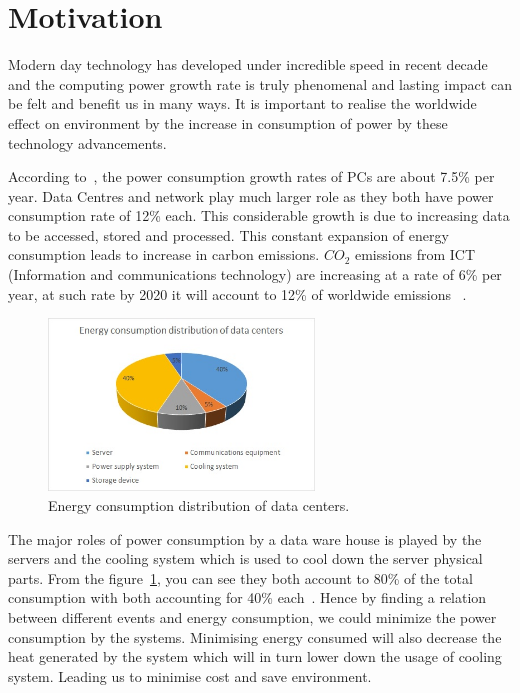 \section{Motivation}
Modern day technology has developed under incredible speed in recent decade and the computing power growth rate is truly phenomenal and lasting impact can be felt and benefit us in many ways. It is important to realise the worldwide effect on environment by the increase in consumption of power by these technology advancements.

According to~\cite{pickavet2008worldwide}, the power consumption growth rates of PCs are about 7.5\% per year. Data Centres and network play much larger role as they both have power consumption rate of 12\% each. This considerable growth is due to increasing data to be accessed, stored and processed. This constant expansion of energy consumption leads to increase in carbon emissions. \(CO_2\) emissions from ICT (Information and communications technology) are increasing at a rate of 6\% per year, at such rate by 2020 it will account to 12\% of worldwide emissions ~\cite{rong2016optimizing}.

\begin{figure}[ht]
	\centering
	\includegraphics[width=200pt]{energypiechart}
	\caption{\label{fig:energypie} Energy consumption distribution of data centers.}
\end{figure}

The major roles of power consumption by a data ware house is played by the servers and the cooling system which is used to cool down the server physical parts. From the figure~\ref{fig:energypie}, you can see they both account to 80\% of the total consumption with both accounting for 40\% each~\cite{rong2016optimizing}. Hence by finding a relation between different events and energy consumption, we could minimize the power consumption by the systems. Minimising energy consumed will also decrease the heat generated by the system which will in turn lower down the usage of cooling system. Leading us to minimise cost and save environment.

